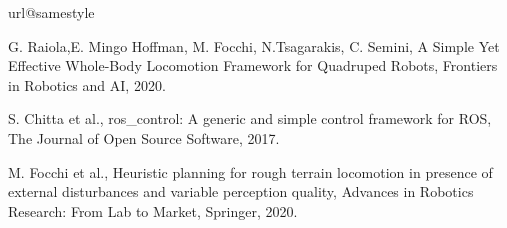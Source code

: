 \scriptsize
\begin{thebibliography}{10}
	\providecommand{\url}[1]{#1}
	\csname url@samestyle\endcsname
	\providecommand{\newblock}{\relax}
	\providecommand{\bibinfo}[2]{#2}
	\providecommand{\BIBentrySTDinterwordspacing}{\spaceskip=0pt\relax}
	\providecommand{\BIBentryALTinterwordstretchfactor}{4}
	\providecommand{\BIBentryALTinterwordspacing}{\spaceskip=\fontdimen2\font plus
		\BIBentryALTinterwordstretchfactor\fontdimen3\font minus
		\fontdimen4\font\relax}
	\providecommand{\BIBforeignlanguage}[2]{{%
			\expandafter\ifx\csname l@#1\endcsname\relax
			\typeout{** WARNING: IEEEtran.bst: No hyphenation pattern has been}%
			\typeout{** loaded for the language `#1'. Using the pattern for}%
			\typeout{** the default language instead.}%
			\else
			\language=\csname l@#1\endcsname
			\fi
			#2}}
	\providecommand{\BIBdecl}{\relax}
	\BIBdecl
	

	G. Raiola,E. Mingo Hoffman, M. Focchi, N.Tsagarakis, C. Semini, A Simple Yet Effective Whole-Body Locomotion Framework for Quadruped Robots, Frontiers in Robotics and AI, 2020.
	
	S. Chitta et al., ros\_control: A generic and simple control framework for ROS, The Journal of Open Source Software, 2017.
	
	M. Focchi et al., Heuristic planning for rough terrain locomotion in presence of external disturbances and variable perception quality, Advances in Robotics Research: From Lab to Market, Springer, 2020.
	
\end{thebibliography}